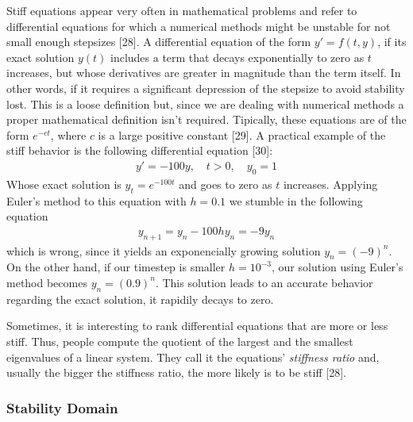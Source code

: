 \documentclass[12pt,twoside]{reedthesis}
\theoremstyle{definition}
\theoremstyle{definition}
\theoremstyle{remark}
\begin{document}
  Stiff equations appear very often in mathematical problems and refer to
  differential equations for which a numerical methods might be unstable
  for not small enough stepsizes {[}28{]}. A differential equation of the
  form \(y' = f(t,y)\), if its exact solution \(y(t)\) includes a term
  that decays exponentially to zero as \(t\) increases, but whose
  derivatives are greater in magnitude than the term itself. In other
  words, if it requires a significant depression of the stepsize to avoid
  stability lost. This is a loose definition but, since we are dealing
  with numerical methods a proper mathematical definition isn't required.
  Tipically, these equations are of the form \(e^{-ct}\), where \(c\) is a
  large positive constant {[}29{]}. A practical example of the stiff
  behavior is the following differential equation {[}30{]}:
  \begin{align*}
  y' = -100y, \,\,\,\,\,\, t > 0, \,\,\,\,\,\, y_0 = 1
  \end{align*}
  Whose exact solution is \(y_t = e^{-100 t}\) and goes to zero as \(t\)
  increases. Applying Euler's method to this equation with \(h=0.1\) we
  stumble in the following equation
  \begin{align*}
  y_{n+1} = y_{n} - 100 h y_{n} = -9y_{n}
  \end{align*}
  which is wrong, since it yields an exponencially growing solution
  \(y_n = (-9)^n\). On the other hand, if our timestep is smaller
  \(h = 10^{-3}\), our solution using Euler's method becomes
  \(y_n = (0.9)^n\). This solution leads to an accurate behavior regarding
  the exact solution, it rapidily decays to zero.
  
  Sometimes, it is interesting to rank differential equations that are
  more or less stiff. Thus, people compute the quotient of the largest and
  the smallest eigenvalues of a linear system. They call it the equations'
  \textit{stiffness ratio} and, usually the bigger the stiffness ratio,
  the more likely is to be stiff {[}28{]}.
  
  \subsubsection{Stability Domain}\label{stability-domain}
  
\end{document}
